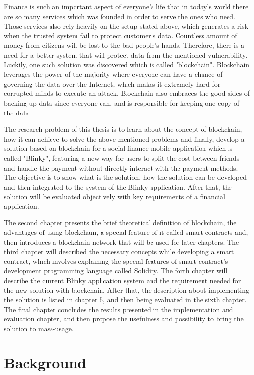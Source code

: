 \documentclass[twoside,numperchapter]{tutthesis} %
\begin{document}
Finance is such an important aspect of everyone's life that in today's world there are so many services which was founded in order to serve the ones who need. Those services also rely heavily on the setup stated above, which generates a risk when the trusted system fail to protect customer's data. Countless amount of money from citizens will be lost to the bad people's hands. Therefore, there is a need for a better system that will protect data from the mentioned vulnerability. Luckily, one such solution was discovered which is called "blockchain". Blockchain leverages the power of the majority where everyone can have a chance of governing the data over the Internet, which makes it extremely hard for corrupted minds to execute an attack. Blockchain also embraces the good sides of backing up data since everyone can, and is responsible for keeping one copy of the data.

The research problem of this thesis is to learn about the concept of blockchain, how it can achieve to solve the above mentioned problems and finally, develop a solution based on blockchain for a social finance mobile application which is called "Blinky", featuring a new way for users to split the cost between friends and handle the payment without directly interact with the payment methods. The objective is to show what is the solution, how the solution can be developed and then integrated to the system of the Blinky application. After that, the solution will be evaluated objectively with key requirements of a financial application.

The second chapter presents the brief theoretical definition of blockchain, the advantages of using blockchain, a special feature of it called smart contracts and, then introduces a blockchain network that will be used for later chapters. The third chapter will described the necessary concepts while developing a smart contract, which involves explaining the special features of smart contract's development programming language called Solidity. The forth chapter will describe the current Blinky application system and the requirement needed for the new solution with blockchain. After that, the description about implementing the solution is listed in chapter 5, and then being evaluated in the sixth chapter. The final chapter concludes the results presented in the implementation and evaluation chapter, and then propose the usefulness and possibility to bring the solution to mass-usage.



\chapter{Background}
\label{ch:background}
\end{document}
